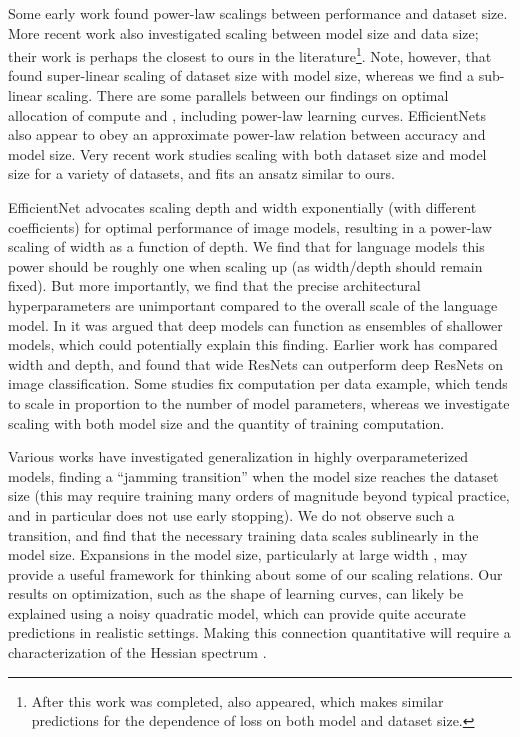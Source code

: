 \documentclass[english]{article}
\begin{document}
Some early \cite{banko2001scaling, DBLP:journals/corr/cs-CL-0108005}   work found power-law scalings between performance and dataset size.  More recent work \cite{1712.00409, Hestness:2019:BHA:3293883.3295710} also investigated scaling between model size and data size; their work is perhaps the closest to ours in the literature\footnote{After this work was completed, \cite{rosenfeld2019constructive} also appeared, which makes similar predictions for the dependence of loss on both model and dataset size.}.  Note, however, that \cite{1712.00409} found super-linear scaling of dataset size with model size, whereas  we find a sub-linear scaling.  There are some parallels between our findings on optimal allocation of compute and \cite{1906.06669}, including power-law learning curves.  EfficientNets \cite{DBLP:journals/corr/abs-1905-11946} also appear to obey an approximate power-law relation between accuracy and model size.  Very recent work \cite{1909.12673} studies scaling with both dataset size and model size for a variety of datasets, and fits an ansatz similar to ours.

EfficientNet \cite{DBLP:journals/corr/abs-1905-11946}   advocates scaling depth and width exponentially (with different coefficients) for optimal performance of image models, resulting in a power-law scaling of width as a function of depth.    We find that for language models this power should be roughly one when scaling up (as width/depth should remain fixed). But more importantly, we find that the precise architectural hyperparameters are unimportant compared to the overall scale of the language model.  In \cite{ResNetsEnsemblesShallow} it was argued that deep models can function as ensembles of shallower models, which could potentially explain this finding.  Earlier work  \cite{Zagoruyko_2016} has compared width and depth, and found that wide ResNets can outperform deep ResNets on image classification.  
Some studies fix computation per data example, which tends to scale in proportion to the number of model parameters, whereas we investigate scaling with both model size and the quantity of training computation. 

Various works \cite{1710.03667,1812.11118} have investigated generalization in highly overparameterized models, finding a ``jamming transition'' \cite{1901.01608} when the model size reaches the dataset size (this may  require training many orders of magnitude beyond typical practice, and in particular does not use early stopping).  We do not observe such a transition, and find that the necessary training data scales sublinearly in the model size.
Expansions in the model size, particularly at large width \cite{jacot2018neural, 1902.06720}, may provide a useful framework for thinking about some of our scaling relations.  Our results on optimization, such as the shape of learning curves, can likely be explained using a noisy quadratic model, which can provide quite accurate predictions \cite{DBLP:journals/corr/abs-1907-04164} in realistic settings.  Making this connection quantitative will require a characterization of the Hessian spectrum \cite{DBLP:journals/corr/abs-1811-07062, DBLP:journals/corr/abs-1901-10159, unpublished-grd}.
\end{document}
